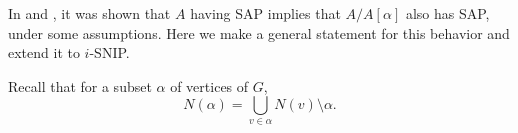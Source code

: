 \documentclass{article}
\theoremstyle{definition}
\newcommand{\trans}{^\top}
\newcommand{\mptn}{\mathcal{S}} %
\begin{document}
In \cite[Lemma~3.5]{BFH05} and \cite[Lemma~3.2]{HvdH07}, it was shown that $A$ having SAP implies that $A/A[\alpha]$ also has SAP, under some assumptions.  Here we make a general statement for this behavior and extend it to $i$-SNIP.  


Recall that for a subset $\alpha$ of vertices of $G$,
\[
    N(\alpha) = \bigcup_{v\in\alpha}N(v) \setminus \alpha.
\]
\end{document}
